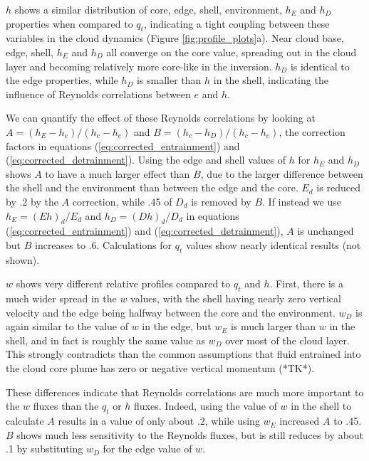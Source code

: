 \documentclass[draft,grl]{agutex}
\begin{document}
\begin{article}
$h$ shows a similar distribution of core, edge, shell, environment, $h_E$ and 
$h_D$ properties when compared to $q_t$, indicating a tight coupling between 
these variables in the cloud dynamics (Figure \ref{fig:profile_plots}a).  Near 
cloud base, edge, shell, $h_E$ and $h_D$ all converge on the core value, 
spreading out in the cloud layer and becoming relatively more core-like in the 
inversion.  $h_D$ is identical to the edge properties, while $h_D$ is smaller 
than $h$ in the shell, indicating the influence of Reynolds correlations 
between $e$ and $h$.

We can quantify the effect of these Reynolds correlations by looking at 
$A = (h_E - h_e)/(h_c - h_e)$ and $B = (h_c - h_D)/(h_c - h_e)$, the correction 
factors in equations (\ref{eq:corrected_entrainment}) and 
(\ref{eq:corrected_detrainment}).  Using the edge and shell values of $h$ for 
$h_E$ and $h_D$ shows $A$ to have a much larger effect than $B$, due to the 
larger difference between the shell and the environment than between the edge 
and the core.  $E_d$ is reduced by .2 by the $A$ correction, while .45 of
$D_d$ is removed by $B$.  If instead we use $h_E = (E h)_d/E_d$ and 
$h_D = (D h)_d/D_d$ in equations (\ref{eq:corrected_entrainment}) and 
(\ref{eq:corrected_detrainment}), $A$ is unchanged but $B$ increases to .6.  
Calculations for $q_t$ values show nearly identical results (not shown).

$w$ shows very different relative profiles compared to $q_t$ and $h$.  First, 
there is a much wider spread in the $w$ values, with the shell having nearly 
zero vertical velocity and the edge being halfway between the core and the 
environment.  $w_D$ is again similar to the value of $w$ in the edge, but $w_E$ 
is much larger than $w$ in the shell, and in fact is roughly the same value as 
$w_D$ over most of the cloud layer.  This strongly contradicts than the common 
assumptions that fluid entrained into the cloud core plume has zero or negative 
vertical momentum (*TK*).

These differences indicate that Reynolds correlations are much more important 
to the $w$ fluxes than the $q_t$ or $h$ fluxes.  Indeed, using the value 
of $w$ in the shell to calculate $A$ results in a value of only about .2, while
using $w_E$ increased $A$ to .45.  $B$ shows much less sensitivity to the 
Reynolds fluxes, but is still reduces by about .1 by substituting $w_D$ for the 
edge value of $w$.



\end{article}
\end{document}
